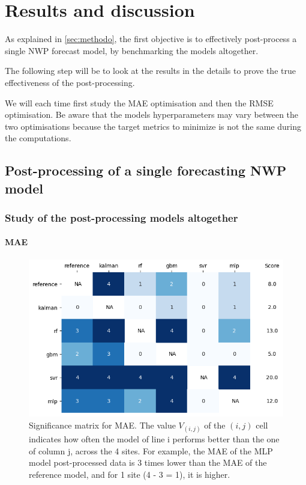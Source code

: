 \section{Results and discussion}

As explained in \autoref{sec:methodo}, the first objective is to effectively post-process a single NWP forecast model, by benchmarking the models altogether. 

The following step will be to look at the results in the details to prove the true effectiveness of the post-processing.

We will each time first study the MAE optimisation and then the RMSE optimisation. Be aware that the models hyperparameters may vary between the two optimisations because the 
target metrics to minimize is not the same during the computations.
\subsection{Post-processing of a single forecasting NWP model}
\subsubsection{Study of the post-processing models altogether} \label{subsubsec:pp}
\paragraph{MAE}\indent
\begin{figure}[htb!]
    \centering
    \includegraphics[width=\columnwidth]{figures/first_study/significance_matrix_mae.png}
\caption{Significance matrix for MAE. The value $V_{(i,j)}$ of the $(i,j)$ cell indicates how often the model of line i performs better than the one of column j, across the 
4 sites. For example, the MAE of the MLP model post-processed data is 3 times lower than the MAE of the reference model, and for 1 site (4 - 3 = 1), it is higher.}
\label{fig:sig_mae}
\end{figure}

